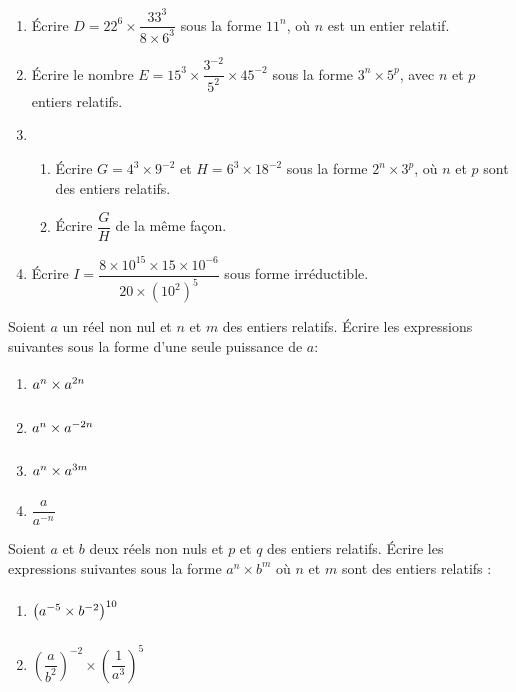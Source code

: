 \documentclass[a4paper]{article}
\begin{document}
\bigskip

\exo\vspace{-2mm}
\begin{enumerate}
  \item Écrire $D=22^6\times\dfrac{33^3}{8\times 6^3}$ sous la forme $11^n$, où $n$ est un entier relatif.
  \item Écrire le nombre $E=15^3\times\dfrac{3^{-2}}{5^2}\times45^{-2}$ sous la forme $3^n\times 5^p$, avec $n$ et $p$ entiers relatifs.
  \item 
    \begin{enumerate}
      \item Écrire $G=4^3\times 9^{-2}$ et $H=6^3\times 18^{-2}$ sous la forme $2^n\times 3^p$, où $n$ et $p$ sont des entiers relatifs.
      \item Écrire $\dfrac{G}{H}$ de la même façon.
    \end{enumerate}
  \item Écrire $I=\dfrac{8\times 10^{15}\times 15\times 10^{-6}}{20\times \left(10^2\right)^5}$ sous forme irréductible.
\end{enumerate}

\bigskip

\exo Soient $a$ un réel non nul et $n$ et $m$ des entiers relatifs. Écrire les expressions suivantes sous la forme d'une seule puissance de $a$:

\begin{multicols}{4}
  \begin{enumerate}
    \item $a^n\times a^{2n}\vphantom{\dfrac{1}{2^2}}$
    \item $a^n\times a^{-2n}\vphantom{\dfrac{1}{2^2}}$
    \item $a^n\times a^{3m}\vphantom{\dfrac{1}{2^2}}$
    \item $\dfrac{a}{a^{-n}}$
  \end{enumerate}
\end{multicols}

\bigskip

\exo Soient $a$ et $b$ deux réels non nuls et $p$ et $q$ des entiers relatifs. Écrire les expressions suivantes sous la forme $a^n\times b^m$ où $n$ et $m$ sont des entiers relatifs :

\begin{multicols}{2}
  \begin{enumerate}
    \item $\left(a^{-5}\times b^{-2}\right)^{10}\vphantom{\left(\dfrac{1}{2^2}\right)^{-2}}$
    \item $\left(\dfrac{a}{b^2}\right)^{-2}\times\left(\dfrac{1}{a^3}\right)^5$
  \end{enumerate}
\end{multicols}
\end{document}
